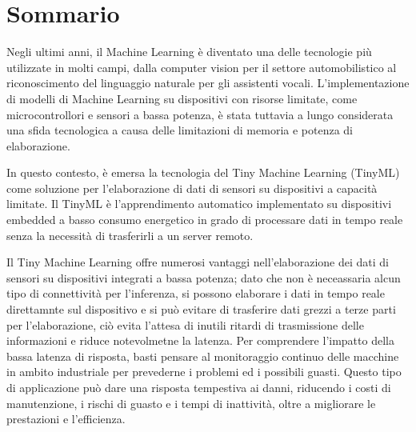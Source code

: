 \chapter*{Sommario} %
\label{sommario}



Negli ultimi anni, il Machine Learning è diventato una delle tecnologie più utilizzate in molti campi, dalla computer vision per il settore automobilistico al riconoscimento del linguaggio naturale per gli assistenti vocali. L'implementazione di modelli di Machine Learning su dispositivi con risorse limitate, come microcontrollori e sensori a bassa potenza, è stata tuttavia a lungo considerata una sfida tecnologica a causa delle limitazioni di memoria e potenza di elaborazione.

In questo contesto, è emersa la tecnologia del Tiny Machine Learning (TinyML) come soluzione per l'elaborazione di dati di sensori su dispositivi a capacità limitate. Il TinyML è l'apprendimento automatico implementato su dispositivi embedded a basso consumo energetico in grado di processare dati in tempo reale senza la necessità di trasferirli a un server remoto.


Il Tiny Machine Learning offre numerosi vantaggi nell'elaborazione dei dati di sensori su dispositivi integrati a bassa potenza; dato che non è neceassaria alcun tipo di connettività per l'inferenza, si possono elaborare i dati in tempo reale direttamnte sul dispositivo e si può evitare di trasferire dati grezzi a terze parti per l'elaborazione, ciò evita l'attesa di inutili ritardi di trasmissione delle informazioni e riduce notevolmetne la latenza. Per comprendere l'impatto della bassa latenza di risposta, basti pensare al monitoraggio continuo delle macchine in ambito industriale per prevederne i problemi ed i possibili guasti. Questo tipo di applicazione può dare una risposta tempestiva ai danni, riducendo i costi di manutenzione, i rischi di guasto e i tempi di inattività, oltre a migliorare le prestazioni e l'efficienza. 

